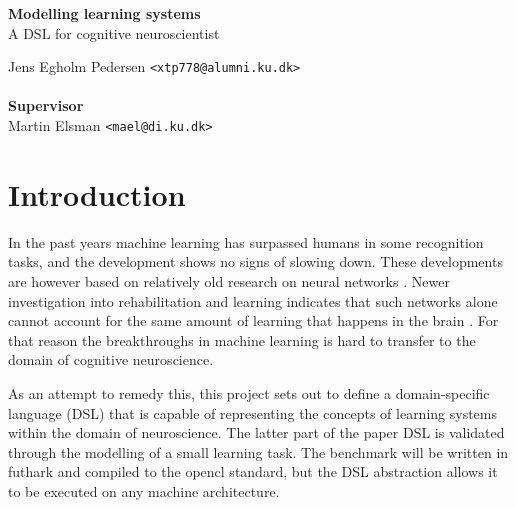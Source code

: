 \documentclass[a4paper,oneside]{memoir}
\begin{document}
    \thispagestyle{empty}
    \begin{adjustwidth}{-3cm}{-1.5cm}
    \vspace*{2.5cm}
    \textbf{\Huge Modelling learning systems} \\
    \vspace*{.8cm}
    {\huge  A DSL for cognitive neuroscientist}\\
    \begin{tabbing}
    Jens Egholm Pedersen \hspace{1cm} \= \texttt{<xtp778@alumni.ku.dk>} \\
    \\[11cm]

    \textbf{\Large Supervisor} \\
    Martin Elsman \hspace{1cm} \texttt{<mael@di.ku.dk>}
    \end{tabbing}
    \end{adjustwidth}
    \newpage
    \ClearWallPaper


\section{Introduction}
In the past years machine learning has surpassed humans in some recognition
tasks, and the development shows no signs of slowing down.
These developments are however based on relatively old research on neural
networks \autocite{Nilsson2009, russel2007}.
Newer investigation into rehabilitation and learning indicates that such
networks alone cannot account for the same amount of learning that happens
in the brain \autocite{Mogensen2011, block2007, russel2007, Moravec98, dennett2017}.
For that reason the breakthroughs in machine learning is hard to transfer
to the domain of cognitive neuroscience.

As an attempt to remedy this, this project sets out to define a domain-specific
language (DSL) that is capable of representing the concepts of learning systems
within the domain of neuroscience.
The latter part of the paper DSL is validated through the modelling of a small
learning task. The benchmark will be written in \gls{futhark} and compiled to
the \gls{opencl} standard, but the DSL abstraction allows it to be executed on
any machine architecture.
\end{document}
